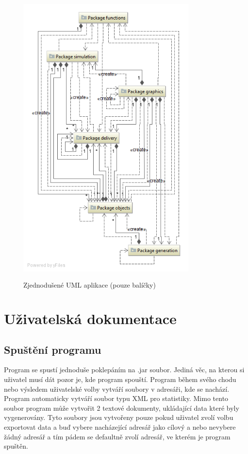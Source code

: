 \documentclass[ 12pt, a4paper]{article}
\begin{document}
\begin{figure}[!ht]
\centering
\includegraphics[width=9cm]{uml.png}
\label{fig:uml}
\caption{Zjednodušené UML aplikace (pouze balíčky)}
\end{figure}

\newpage
%
%
\section{Uživatelská dokumentace}
\subsection{Spuštění programu}
Program se spustí jednoduše poklepáním na .jar soubor. Jediná věc, na kterou si uživatel musí dát pozor je, kde program spouští. Program během svého chodu nebo výsledem uživatelské volby vytváří soubory v adresáři, kde se nachází. Program automaticky vytváří soubor typu XML pro statistiky. Mimo tento soubor program může vytvořit 2 textové dokumenty, ukládající data které byly vygenerovány. Tyto soubory jsou vytvořeny pouze pokud uživatel zvolí volbu exportovat data a buď vybere nacházející adresář jako cílový a nebo nevybere žádný adresář a tím pádem se defaultně zvolí adresář, ve kterém je program spuštěn.\newline\newline
\end{document}
